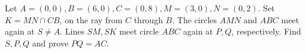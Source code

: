 Let $A=(0,0),B=(6,0),C=(0,8),M=(3,0),N=(0,2)$. Set $K=MN\cap CB$, on the ray from $C$ through $B$. The circles $AMN$ and $ABC$ meet again at $S\ne A$. Lines $SM,SK$ meet circle $ABC$ again at $P,Q$, respectively. Find $S,P,Q$ and prove $PQ=AC$.
